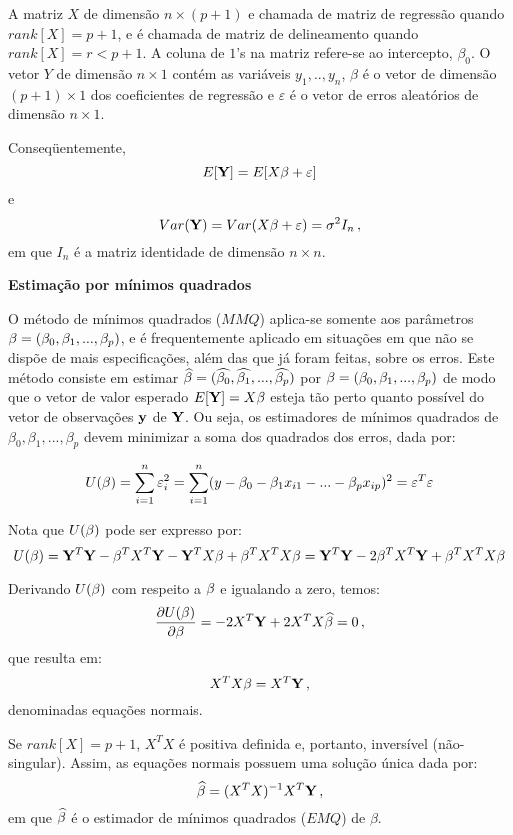 \documentclass[]{article}
\begin{document}
A matriz \(X\) de dimensão \(n \times (p+1)\) e chamada de matriz de
regressão quando \(rank[X] = p+1\), e é chamada de matriz de
delineamento quando \(rank[X] = r < p+1\). A coluna de \(1\)'s na matriz
refere-se ao intercepto, \(\beta_0\). O vetor \(Y\) de dimensão
\(n \times 1\) contém as variáveis \(y_1,..,y_n\), \(\beta\) é o vetor
de dimensão \((p+1) \times 1\) dos coeficientes de regressão e
\(\varepsilon\) é o vetor de erros aleatórios de dimensão
\(n \times 1\).

Conseqüentemente, \[E[{ \bf Y}] = E[X{ \bf \beta}+{ \bf \varepsilon}]\]
e
\[Var({ \bf Y}) = Var(X{ \bf \beta}+{ \bf \varepsilon}) = \sigma^2 I_n\,,\]
em que \(I_n\) é a matriz identidade de dimensão \(n \times n\).

\textbf{Estimação por mínimos quadrados}

O método de mínimos quadrados (\(MMQ\)) aplica-se somente aos parâmetros
\({ \bf \beta} = (\beta_0,\beta_1,...,\beta_p)\), e é frequentemente
aplicado em situações em que não se dispõe de mais especificações, além
das que já foram feitas, sobre os erros. Este método consiste em estimar
\(\widehat{{ \bf \beta}} = (\widehat{\beta_0},\widehat{\beta_1},...,\widehat{\beta_p})\)
por \({ \bf \beta} = (\beta_0,\beta_1,...,\beta_p)\) de modo que o vetor
de valor esperado \(E[{ \bf Y}] = X{ \bf \beta}\) esteja tão perto
quanto possível do vetor de observações \({ \bf y}\) de \({ \bf Y}\). Ou
seja, os estimadores de mínimos quadrados de
\(\beta_0,\beta_1,...,\beta_p\) devem minimizar a soma dos quadrados dos
erros, dada por:

\[U({ \bf \beta}) = \displaystyle\sum_{i=1}^n\varepsilon_i^2 = \displaystyle\sum_{i=1}^n(y - \beta_0 - \beta_1x_{i1} - ... - \beta_px_{ip})^2 = 
{ \bf \varepsilon}^T{ \bf \varepsilon}\]

Nota que \(U({ \bf \beta})\) pode ser expresso por:
\[U({ \bf \beta}) = { \bf Y}^T{ \bf Y} - { \bf \beta}^TX^T{ \bf Y} - { \bf Y}^TX{ \bf \beta} + { \bf \beta}^TX^TX{ \bf \beta} = { \bf Y}^T{ \bf Y} - 2{ \bf \beta}^TX^T{ \bf Y} + { \bf \beta}^TX^TX{ \bf \beta}\]

Derivando \(U({ \bf \beta})\) com respeito a \({ \bf \beta}\) e
igualando a zero, temos:
\[\dfrac{\partial U({ \bf \beta})}{\partial { \bf \beta}} = - 2X^T{ \bf Y} + 2X^TX\widehat{{ \bf \beta}} = 0 \,,\]
que resulta em: \[X^TX{ \bf \beta} = X^T{ \bf Y} \,,\] denominadas
equações normais.

Se \(rank[X] = p+1\), \(X^TX\) é positiva definida e, portanto,
inversível (não-singular). Assim, as equações normais possuem uma
solução única dada por:
\[\widehat{{ \bf \beta}} = (X^TX)^{-1}X^T{ \bf Y} \,,\] em que
\(\widehat{{ \bf \beta}}\) é o estimador de mínimos quadrados (\(EMQ\))
de \(\beta\).
\end{document}
